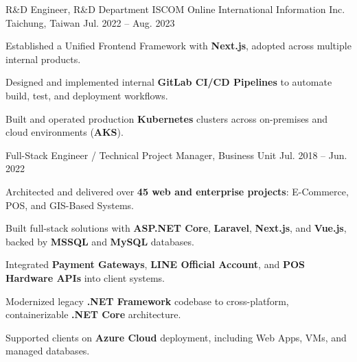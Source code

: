 

\begin{cventries}

  \cventry
    {R\&D Engineer, R\&D Department} %
    {ISCOM Online International Information Inc.} %
    {Taichung, Taiwan} %
    {Jul. 2022 -- Aug. 2023} %
    {
      \begin{cvitems}
        \item {Established a Unified Frontend Framework with \textbf{Next.js}, adopted across multiple internal products.}
        \item {Designed and implemented internal \textbf{GitLab CI/CD Pipelines} to automate build, test, and deployment workflows.}
        \item {Built and operated production \textbf{Kubernetes} clusters across on-premises and cloud environments (\textbf{AKS}).}
      \end{cvitems}
    }

  \cventry
    {Full-Stack Engineer / Technical Project Manager, Business Unit} %
    {} %
    {} %
    {Jul. 2018 -- Jun. 2022} %
    {
      \begin{cvitems}
        \item {Architected and delivered over \textbf{45 web and enterprise projects}: E-Commerce, POS, and GIS-Based Systems.}
        \item {Built full-stack solutions with \textbf{ASP.NET Core}, \textbf{Laravel}, \textbf{Next.js}, and \textbf{Vue.js}, backed by \textbf{MSSQL} and \textbf{MySQL} databases.}
        \item {Integrated \textbf{Payment Gateways}, \textbf{LINE Official Account}, and \textbf{POS Hardware APIs} into client systems.}
        \item {Modernized legacy \textbf{.NET Framework} codebase to cross-platform, containerizable \textbf{.NET Core} architecture.}
        \item {Supported clients on \textbf{Azure Cloud} deployment, including Web Apps, VMs, and managed databases.}
      \end{cvitems}
    }


\end{cventries}
